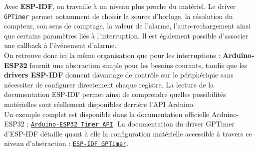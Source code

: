 Avec \textbf{ESP-IDF}, on travaille à un niveau plus proche du matériel. Le driver \texttt{GPTimer} permet notamment de choisir la source d'horloge, la résolution du compteur, son sens de comptage, la valeur de l'alarme, l'auto-rechargement ainsi que certains paramètres liés à l'interruption. Il est également possible d'associer une callback à l'événement d'alarme. \cite{esp32s3_gptimer} \\

On retrouve donc ici la même organisation que pour les interruptions : \textbf{Arduino-ESP32} fournit une abstraction simple pour les besoins courants, tandis que les \textbf{drivers ESP-IDF} donnent davantage de contrôle sur le périphérique sans nécessiter de configurer directement chaque registre. La lecture de la documentation ESP-IDF permet ainsi de comprendre quelles possibilités matérielles sont réellement disponibles derrière l'API Arduino.\\


Un exemple complet est disponible dans la documentation officielle Arduino-ESP32 : \href{https://docs.espressif.com/projects/arduino-esp32/en/latest/api/timer.html}{\texttt{Arduino-ESP32 Timer API}}. La documentation du driver GPTimer d'ESP-IDF détaille quant à elle la configuration matérielle accessible à travers ce niveau d'abstraction : \href{https://docs.espressif.com/projects/esp-idf/en/latest/esp32s3/api-reference/peripherals/gptimer.html}{\texttt{ESP-IDF GPTimer}}. \cite{arduino_timer,esp32s3_gptimer}\










